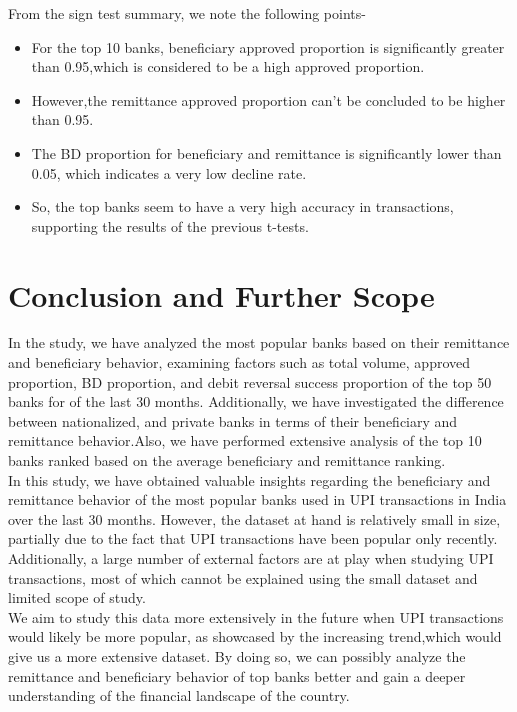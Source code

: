 \documentclass{article}
\begin{document}
From the sign test summary, we note the following points-
\begin{itemize}
    \item For the top 10 banks, beneficiary approved proportion is significantly greater than 0.95,which is considered to be a high approved proportion.
    \item However,the remittance approved proportion can't be concluded to be higher than 0.95.
    \item The BD proportion for beneficiary and remittance is significantly lower than 0.05, which indicates a very low decline rate. 
    \item So, the top banks seem to have a very high accuracy in transactions, supporting the results of the previous t-tests.
\end{itemize}


\newpage
\section{Conclusion and Further Scope}

In the study, we have analyzed the most popular banks based on their remittance and beneficiary behavior, examining factors such as total volume, approved proportion, BD proportion, and debit reversal success proportion of the top 50 banks for of the last 30 months. Additionally, we have investigated the difference between nationalized, and private banks in terms of their beneficiary and remittance behavior.Also, we have performed extensive analysis of the top 10 banks ranked based on the average beneficiary and remittance ranking.\\

In this study, we have obtained valuable insights regarding the beneficiary and remittance behavior of the most popular banks used in UPI transactions in India over the last 30 months. However, the dataset at hand is relatively small in size, partially due to the fact that UPI transactions have been popular only recently. Additionally, a large number of external factors are at play when studying UPI transactions, most of which cannot be explained using the small dataset and limited scope of study.\\

We aim to study this data more extensively in the future when UPI transactions would likely be more popular, as showcased by the increasing trend,which would give us a more extensive dataset. By doing so, we can possibly analyze the remittance and beneficiary behavior of top banks better and gain a deeper understanding of the financial landscape of the country.
\end{document}
